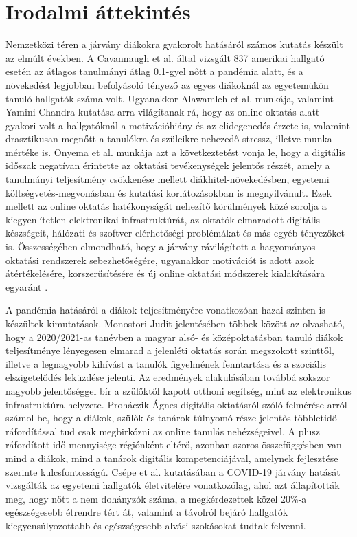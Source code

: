 \documentclass[12pt]{article}
\begin{document}
\newpage

\section{Irodalmi áttekintés}

Nemzetközi téren a járvány diákokra gyakorolt hatásáról számos kutatás készült az elmúlt években. A Cavannaugh et al. \cite{student_perf1} által vizsgált 837 amerikai hallgató esetén az átlagos tanulmányi átlag 0.1-gyel nőtt a pandémia alatt, és a növekedést legjobban befolyásoló tényező az egyes diákoknál az egyetemükön tanuló hallgatók száma volt. Ugyanakkor Alawamleh et al. \cite{student_perf8} munkája, valamint Yamini Chandra \cite{student_perf6} kutatása arra világítanak rá, hogy az online oktatás alatt gyakori volt a hallgatóknál a motivációhiány és az elidegenedés érzete is, valamint drasztikusan megnőtt a tanulókra és szüleikre nehezedő stressz, illetve munka mértéke is.
Onyema et al. \cite{student_perf5} munkája azt a következtetést vonja le, hogy a digitális időszak negatívan érintette az oktatási tevékenységek jelentős részét, amely a tanulmányi teljesítmény csökkenése mellett diákhitel-növekedésben, egyetemi költségvetés-megvonásban és kutatási korlátozásokban is megnyilvánult. Ezek mellett az online oktatás hatékonyságát nehezítő körülmények közé sorolja a kiegyenlítetlen elektronikai infrastruktúrát, az oktatók elmaradott digitális készségeit, hálózati és szoftver elérhetőségi problémákat és más egyéb tényezőket is.
Összességében elmondható, hogy a járvány rávilágított a hagyományos oktatási rendszerek sebezhetőségére, ugyanakkor motivációt is adott azok átértékelésére, korszerűsítésére és új online oktatási módszerek kialakítására egyaránt \cite{student_perf7, student_perf9}. 

A pandémia hatásáról a diákok teljesítményére vonatkozóan hazai szinten is készültek kimutatások. Monostori Judit \cite{magyar1} jelentésében többek között az olvasható, hogy a 2020/2021-as tanévben a magyar alsó- és középoktatásban tanuló diákok teljesítménye lényegesen elmarad a jelenléti oktatás során megszokott szinttől, illetve a legnagyobb kihívást a tanulók figyelmének fenntartása és a szociális elszigetelődés leküzdése jelenti. Az eredmények alakulásában továbbá sokszor nagyobb jelentőséggel bír a szülőktől kapott otthoni segítség, mint az elektronikus infrastruktúra helyzete.
Proháczik Ágnes \cite{magyar2} digitális oktatásról szóló felmérése arról számol be, hogy  a diákok, szülők és tanárok túlnyomó része jelentős többletidő-ráfordítással tud csak megbirkózni az online tanulás nehézségeivel. A plusz ráfordított idő mennyisége régiónként eltérő, azonban szoros összefüggésben van mind a diákok, mind a tanárok digitális kompetenciájával, amelynek fejlesztése szerinte kulcsfontosságú. 
Csépe et al. \cite{magyar3} kutatásában a COVID-19 járvány hatását vizsgálták az egyetemi hallgatók életvitelére vonatkozólag, ahol azt állapították meg, hogy nőtt a nem dohányzók száma, a megkérdezettek közel 20\%-a egészségesebb étrendre tért át, valamint a távolról bejáró hallgatók kiegyensúlyozottabb és egészségesebb alvási szokásokat tudtak felvenni.
\end{document}
